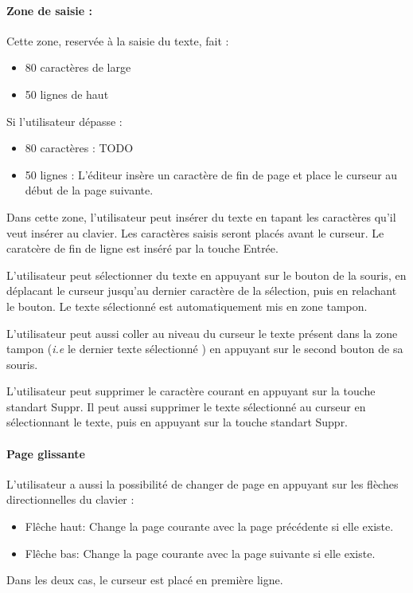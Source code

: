 \paragraph{Zone de saisie :} Cette zone, reservée à la saisie du texte, fait :
\begin{itemize}
	\item 80 caractères de large
	\item 50 lignes de haut
\end{itemize}

Si l'utilisateur dépasse :
\begin{itemize}
	\item 80 caractères : TODO 
	\item 50 lignes : L'éditeur insère un caractère de fin de page et place le curseur au début de la page suivante.
\end{itemize}

Dans cette zone, l'utilisateur peut insérer du texte en tapant les caractères qu'il veut insérer au clavier. Les caractères saisis seront placés avant le curseur. Le caratcère de fin de ligne est inséré par la touche \og Entrée\fg.

L'utilisateur peut sélectionner du texte en appuyant sur le bouton de la souris, en déplacant le curseur jusqu'au dernier caractère de la sélection, puis en relachant le bouton. Le texte sélectionné est automatiquement mis en zone tampon.

L'utilisateur peut aussi coller au niveau du curseur le texte présent dans la zone tampon (\textsl{i.e} le dernier texte sélectionné ) en appuyant sur le second bouton de sa souris.

L'utilisateur peut supprimer le caractère courant en appuyant sur la touche standart \og Suppr\fg. Il peut aussi supprimer le texte sélectionné au curseur en sélectionnant le texte, puis en appuyant sur la touche standart \og Suppr\fg.

\paragraph{Page glissante}
L'utilisateur a aussi la possibilité de changer de page en appuyant sur les flèches directionnelles du clavier :
\begin{itemize}
	\item \og Flêche haut\fg : Change la page courante avec la page précédente si elle existe.
	\item \og Flêche bas\fg : Change la page courante avec la page suivante si elle existe.
\end{itemize}
Dans les deux cas, le curseur est placé en première ligne.

